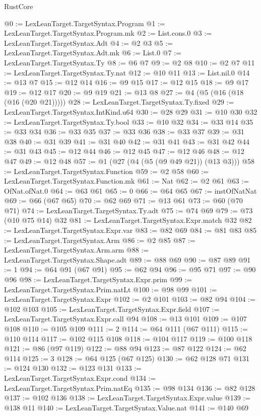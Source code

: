 \begin{lexlean}{RustCore}
\begin{coremodule}
@0 := LexLeanTarget.TargetSyntax.Program
@1 := LexLeanTarget.TargetSyntax.Program.mk
@2 := List.cons.{0}
@3 := LexLeanTarget.TargetSyntax.Adt
@4 := @2 @3
@5 := LexLeanTarget.TargetSyntax.Adt.mk
@6 := List.{0}
@7 := LexLeanTarget.TargetSyntax.Ty
@8 := @6 @7
@9 := @2 @8
@10 := @2 @7
@11 := LexLeanTarget.TargetSyntax.Ty.nat
@12 := @10 @11
@13 := List.nil.{0}
@14 := @13 @7
@15 := @12 @14
@16 := @9 @15
@17 := @12 @15
@18 := @9 @17
@19 := @12 @17
@20 := @9 @19
@21 := @13 @8
@27 := @4 (@5 (@16 (@18 (@16 (@20 @21)))))
@28 := LexLeanTarget.TargetSyntax.Ty.fixed
@29 := LexLeanTarget.TargetSyntax.IntKind.u64
@30 := @28 @29
@31 := @10 @30
@32 := LexLeanTarget.TargetSyntax.Ty.bool
@33 := @10 @32
@34 := @33 @14
@35 := @33 @34
@36 := @33 @35
@37 := @33 @36
@38 := @33 @37
@39 := @31 @38
@40 := @31 @39
@41 := @31 @40
@42 := @31 @41
@43 := @31 @42
@44 := @31 @43
@45 := @12 @44
@46 := @12 @45
@47 := @12 @46
@48 := @12 @47
@49 := @12 @48
@57 := @1 (@27 (@4 (@5 (@9 @49 @21)) (@13 @3)))
@58 := LexLeanTarget.TargetSyntax.Function
@59 := @2 @58
@60 := LexLeanTarget.TargetSyntax.Function.mk
@61 := Nat
@62 := @2 @61
@63 := OfNat.ofNat.{0}
@64 := @63 @61
@65 := 0
@66 := @64 @65
@67 := instOfNatNat
@69 := @66 (@67 @65)
@70 := @62 @69
@71 := @13 @61
@73 := @60 (@70 @71)
@74 := LexLeanTarget.TargetSyntax.Ty.adt
@75 := @74 @69
@79 := @73 (@10 @75 @14) @32
@81 := LexLeanTarget.TargetSyntax.Expr.match @32
@82 := LexLeanTarget.TargetSyntax.Expr.var
@83 := @82 @69
@84 := @81 @83
@85 := LexLeanTarget.TargetSyntax.Arm
@86 := @2 @85
@87 := LexLeanTarget.TargetSyntax.Arm.arm
@88 := LexLeanTarget.TargetSyntax.Shape.adt
@89 := @88 @69
@90 := @87 @89
@91 := 1
@94 := @64 @91 (@67 @91)
@95 := @62 @94
@96 := @95 @71
@97 := @90 @96
@98 := LexLeanTarget.TargetSyntax.Expr.prim
@99 := LexLeanTarget.TargetSyntax.Prim.natLt
@100 := @98 @99
@101 := LexLeanTarget.TargetSyntax.Expr
@102 := @2 @101
@103 := @82 @94
@104 := @102 @103
@105 := LexLeanTarget.TargetSyntax.Expr.field
@107 := LexLeanTarget.TargetSyntax.Expr.call @94
@108 := @13 @101
@109 := @107 @108
@110 := @105 @109
@111 := 2
@114 := @64 @111 (@67 @111)
@115 := @110 @114
@117 := @102 @115 @108
@118 := @104 @117
@119 := @100 @118
@121 := @86 (@97 @119)
@122 := @88 @94
@123 := @87 @122
@124 := @62 @114
@125 := 3
@128 := @64 @125 (@67 @125)
@130 := @62 @128 @71
@131 := @124 @130
@132 := @123 @131
@133 := LexLeanTarget.TargetSyntax.Expr.cond
@134 := LexLeanTarget.TargetSyntax.Prim.natEq
@135 := @98 @134
@136 := @82 @128
@137 := @102 @136
@138 := LexLeanTarget.TargetSyntax.Expr.value
@139 := @138 @11
@140 := LexLeanTarget.TargetSyntax.Value.nat
@141 := @140 @69

\end{coremodule}
\end{lexlean}
